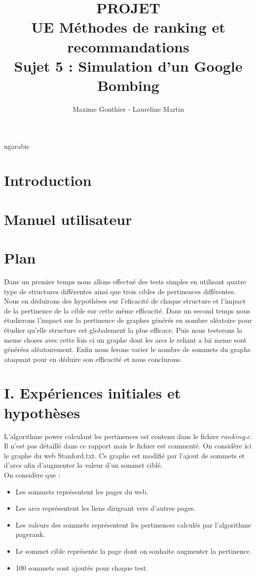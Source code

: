 \documentclass[a4paper,11pt]{article}
\title{PROJET\\ UE Méthodes de ranking et recommandations\\ 
		Sujet 5 : Simulation d'un Google Bombing}
\author{Maxime Gonthier - Laureline Martin}
\begin{document}
\clearpage
	\clearpage
	\maketitle
	\newpage\clearpage\pagenumberi ng{arabic}

\newpage
\tableofcontents
\newpage

\section{Introduction}
	
	
\section{Manuel utilisateur}
	

\section{Plan}
	Dans un premier temps nous allons effectué des tests simples en utilisant quatre type de structures différentes ainsi que trois cibles de pertinences différentes.
	Nous en déduirons des hypothèses sur l'eficacité de chaque structure et l'impact de la pertinence de la cible sur cette même efficacité.
	Dans un second temps nous étudierons l'impact sur la pertinence de graphes générés en nombre aléatoire pour étudier qu'elle structure est globalement la plus efficace.
	Puis nous testerons la meme choses avec cette fois ci un graphe dont les arcs le reliant a lui meme sont générées aléatoirement.
	Enfin nous ferons varier le nombre de sommets du graphe ataquant pour en déduire son efficacité et nous conclurons.
	
\section{I.		Expériences initiales et hypothèses}
	
	L'algorithme power calculant les pertinences est contenu dans le fichier $ranking.c$. Il n'est pas détaillé dans ce rapport mais le fichier est commenté.
	On considère ici le graphe du web Stanford.txt. Ce graphe est modifié par l'ajout de sommets et d'arcs afin d'augmenter la valeur d'un sommet ciblé.\\
	On considère que :\\
	\begin{itemize}
		\item Les sommets représentent les pages du web.
		\item Les arcs représentent les liens dirigeant vers d'autres pages.
		\item Les valeurs des sommets représentent les pertinences calculés par l'algorithme pagerank.
		\item Le sommet cible représente la page dont on souhaite augmenter la pertinence.
		\item 100 sommets sont ajoutés pour chaque test.
	\end{itemize}
\end{document}
